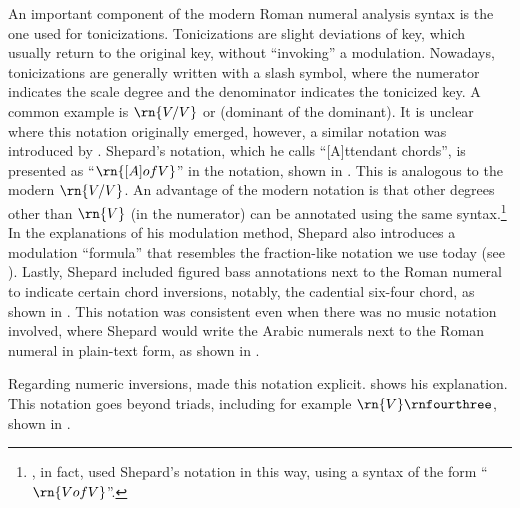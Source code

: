 An important component of the modern Roman numeral analysis
syntax is the one used for tonicizations. Tonicizations are
slight deviations of key, which usually return to the
original key, without ``invoking'' a modulation. Nowadays,
tonicizations are generally written with a slash symbol,
where the numerator indicates the scale degree and the
denominator indicates the tonicized key. A common example is
$\rn{V/V}$ or (dominant of the dominant). It is unclear
where this notation originally emerged, however, a similar
notation was introduced by \textcite{shepard1889how}.
Shepard's notation, which he calls ``[A]ttendant chords'',
is presented as ``$\rn{[A] of V}$'' in the notation, shown
in . This is
analogous to the modern $\rn{V/V}$. An advantage of the
modern notation is that other degrees other than $\rn{V}$
(in the numerator) can be annotated using the same
syntax.\footnote{\textcite{piston1941harmony}, in fact, used
Shepard's notation in this way, using a syntax of the form
``$\rn{V of V}$''.} In the explanations of his modulation
method, Shepard also introduces a modulation ``formula''
that resembles the fraction-like notation we use today (see
). Lastly, Shepard
included figured bass annotations next to the Roman numeral
to indicate certain chord inversions, notably, the cadential
six-four chord, as shown in
. This
notation was consistent even when there was no music
notation involved, where Shepard would write the Arabic
numerals next to the Roman numeral in plain-text form, as
shown in .





Regarding numeric inversions, \textcite{chadwick1897harmony}
made this notation explicit.
shows his explanation. This notation goes beyond triads,
including for example $\rn{V}\rnfourthree$, shown in
.

